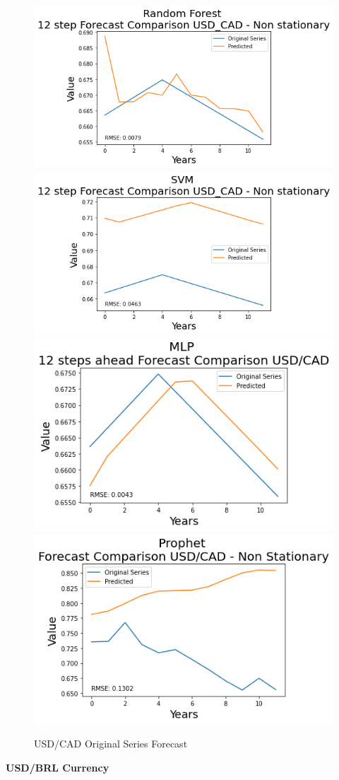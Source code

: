 \documentclass[10pt,twocolumn,letterpaper]{article}
\begin{document}
	\begin{figure}[h]
		\centering
		\includegraphics[width=0.45\linewidth]{../img/RandomForest/usd_cad_for}
		\includegraphics[width=0.45\linewidth]{../img/SVM/usd_cad_for}
		\includegraphics[width=0.45\linewidth]{../img/MLP/usd_cad_for}
		\includegraphics[width=0.45\linewidth]{../img/Prophet/usd_cad_for}
		\caption{USD/CAD Original Series Forecast}
		\label{fig:usd_cadforecast}
	\end{figure}
	
	\textbf{USD/BRL Currency}
	
\end{document}
